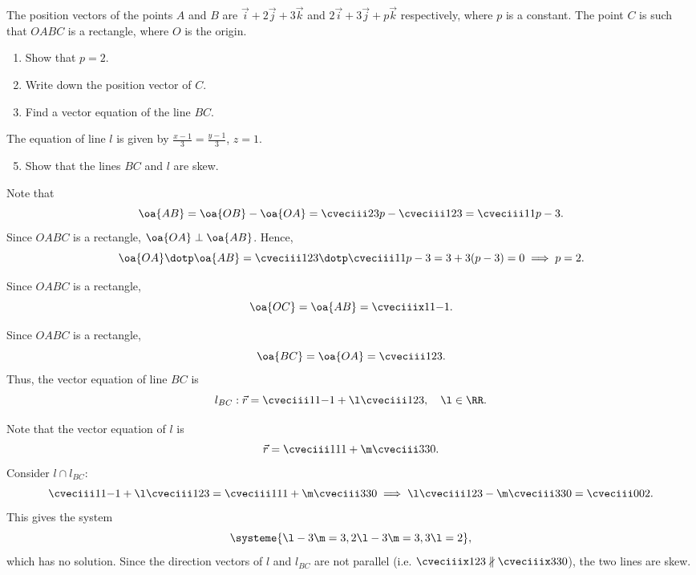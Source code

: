 \begin{problem}
    The position vectors of the points $A$ and $B$ are $\vec i + 2 \vec j + 3 \vec k$ and $2\vec i + 3 \vec j + p \vec k$ respectively, where $p$ is a constant. The point $C$ is such that $OABC$ is a rectangle, where $O$ is the origin.

    \begin{enumerate}
        \item Show that $p = 2$.
        \item Write down the position vector of $C$.
        \item Find a vector equation of the line $BC$.
    \end{enumerate}

    The equation of line $l$ is given by $\frac{x-1}{3} = \frac{y-1}{3}$, $z = 1$.

    \begin{enumerate}
        \setcounter{enumi}{4}
        \item Show that the lines $BC$ and $l$ are skew.
    \end{enumerate}
\end{problem}
\begin{solution}
    \begin{ppart}
        Note that \[\oa{AB} = \oa{OB} - \oa{OA} = \cveciii23p - \cveciii123 = \cveciii11{p-3}.\] Since $OABC$ is a rectangle, $\oa{OA} \perp \oa{AB}$. Hence, \[\oa{OA} \dotp \oa{AB} = \cveciii123 \dotp \cveciii11{p-3} = 3 + 3(p-3) = 0 \implies p = 2.\]
    \end{ppart}
    \begin{ppart}
        Since $OABC$ is a rectangle, \[\oa{OC} = \oa{AB} = \cveciiix11{-1}.\]
    \end{ppart}
    \begin{ppart}
        Since $OABC$ is a rectangle, \[\oa{BC} = \oa{OA} = \cveciii123.\] Thus, the vector equation of line $BC$ is \[l_{BC} : \vec r = \cveciii11{-1} + \l \cveciii123, \quad \l \in \RR.\]
    \end{ppart}
    \begin{ppart}
        Note that the vector equation of $l$ is \[\vec r = \cveciii111 + \m \cveciii330.\] Consider $l \cap l_{BC}$: \[\cveciii11{-1} + \l \cveciii123 = \cveciii111 + \m \cveciii330 \implies \l\cveciii123 - \m \cveciii330 = \cveciii002.\] This gives the system \[\systeme{\l - 3 \m = 3, 2\l - 3\m = 3, 3\l = 2},\] which has no solution. Since the direction vectors of $l$ and $l_{BC}$ are not parallel (i.e. $\cveciiix123 \nparallel \cveciiix330$), the two lines are skew.
    \end{ppart}
\end{solution}

